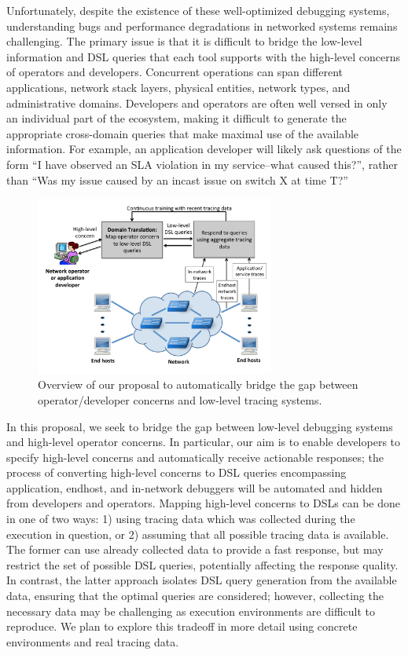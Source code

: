Unfortunately, despite the existence of these well-optimized debugging systems,
understanding bugs and performance degradations in networked systems remains
challenging. The primary issue is that it is difficult to bridge the low-level
information and DSL queries that each tool supports with the high-level concerns of
operators and developers. Concurrent operations can span different
applications, network stack layers, physical entities, network types, and
administrative domains. Developers and operators are often well versed in only
an individual part of the ecosystem, making it difficult to generate the
appropriate cross-domain queries that make maximal use of the available
information. For example, an application developer will likely ask questions of
the form ``I have observed an SLA violation in my service--what caused this?'',
rather than ``Was my issue caused by an incast issue on switch X at time T?''

\begin{figure}[t]
\centering
\includegraphics[width=0.7\textwidth]{tracing_figure.pdf}
\caption{Overview of our proposal to automatically bridge the gap between
operator/developer concerns and low-level tracing systems.}
\label{fig:overview}
\end{figure}

In this proposal, we seek to bridge the gap between low-level debugging systems
and high-level operator concerns. In particular, our aim is to enable
developers to specify high-level concerns and automatically receive actionable
responses; the process of converting high-level concerns to DSL queries
encompassing application, endhost, and in-network debuggers will be automated
and hidden from developers and operators. Mapping high-level concerns to DSLs
can be done in one of two ways: 1) using tracing data which was collected
during the execution in question, or 2) assuming that all possible tracing data
is available. The former can use already collected data to provide a fast
response, but may restrict the set of possible DSL queries, potentially
affecting the response quality. In contrast, the latter approach isolates DSL
query generation from the available data, ensuring that the optimal queries are
considered; however, collecting the necessary data may be challenging as
execution environments are difficult to reproduce. We plan to explore this tradeoff
in more detail using concrete environments and real tracing data.

